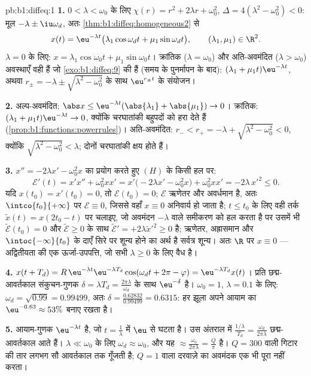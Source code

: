 \begin{solution}{pb:b1:diffeq:1}
\textbf{1.} $0 < \lambda < \omega_0$ के लिए $\chi(r) = r^2 + 2\lambda r +
\omega_0^2$, $\Delta = 4(\lambda^2 - \omega_0^2) < 0$: मूल $-\lambda \pm
\iu\omega_d$, अतः \cref{thm:b1:diffeq:homogeneous2} से
\[
x(t) = \eu^{-\lambda t}\bigl(\lambda_1\cos\omega_d t +
\mu_1\sin\omega_d t\bigr), \qquad (\lambda_1, \mu_1) \in \R^2 .
\]
$\lambda = 0$ के लिए: $x = \lambda_1\cos\omega_0 t + \mu_1\sin\omega_0 t$।
क्रांतिक ($\lambda = \omega_0$) और अति-अवमंदित ($\lambda > \omega_0$)
अवस्थाएँ वही हैं जो \cref{exo:b1:diffeq:9} की हैं (समय के पुनर्मापन के बाद):
$(\lambda_1 + \mu_1 t)\eu^{-\lambda t}$, अथवा $r_\pm = -\lambda \pm
\sqrt{\lambda^2 - \omega_0^2}$ के साथ $\eu^{r_\pm t}$ के संयोजन।

\textbf{2.} अल्प-अवमंदित: $\abs x \leq \eu^{-\lambda t}(\abs{\lambda_1} +
\abs{\mu_1}) \to 0$। क्रांतिक: $(\lambda_1 + \mu_1 t)\eu^{-\lambda t} \to
0$, क्योंकि चरघातांकी बहुपदों को हरा देते हैं
(\cref{prop:b1:functions:powerrules})। अति-अवमंदित: $r_- < r_+ = -\lambda +
\sqrt{\lambda^2 - \omega_0^2} < 0$, क्योंकि $\sqrt{\lambda^2 - \omega_0^2} <
\lambda$; दोनों चरघातांकी क्षय होते हैं।

\textbf{3.} $x'' = -2\lambda x' - \omega_0^2 x$ का प्रयोग करते हुए $(H)$ के
किसी हल पर:
\[
\mathcal E'(t) = x'x'' + \omega_0^2 x x'
= x'\bigl(-2\lambda x' - \omega_0^2 x\bigr) + \omega_0^2 xx'
= -2\lambda\,x'^2 \leq 0 .
\]
यदि $x(t_0) = x'(t_0) = 0$, तो $\mathcal E(t_0) = 0$; $\mathcal E$ ऋणेतर और
अवर्धमान है, अतः $\intco{t_0}{+\infty}$ पर $\mathcal E \equiv 0$, जिससे वहाँ
$x \equiv 0$ अनिवार्य हो जाता है; $t \leq t_0$ के लिए वही तर्क $\tilde x(t)
= x(2t_0 - t)$ पर चलाइए, जो अवमंदन $-\lambda$ वाले समीकरण को हल करता है पर
उसमें भी $\tilde{\mathcal E}(t_0) = 0$ और $\tilde{\mathcal E} \geq 0$ के साथ
$\tilde{\mathcal E}' = +2\lambda\tilde x'^2 \geq 0$ है; ऋणेतर, अह्रासमान और
$\intoc{-\infty}{t_0}$ के दाएँ सिरे पर शून्य होने का अर्थ है सर्वत्र शून्य।
अतः $\R$ पर $x \equiv 0$ --- अद्वितीयता की एक ऊर्जा-उपपत्ति, जो सभी $\lambda
\geq 0$ के लिए वैध है।

\textbf{4.} $x(t + T_d) = R\,\eu^{-\lambda t}\eu^{-\lambda T_d}\cos(\omega_d
t + 2\pi - \varphi) = \eu^{-\lambda T_d}x(t)$। प्रति छद्म-आवर्तकाल
संकुचन-गुणक $\delta = \lambda T_d = \frac{2\pi\lambda}{\omega_d}$ के साथ
$\eu^{-\delta}$ है। $\omega_0 = 1$, $\lambda = 0.1$ के लिए: $\omega_d =
\sqrt{0.99} = 0.99499$, अतः $\delta = \frac{0.62832}{0.99499} = 0.6315$: हर
झूला अपने आयाम का $\eu^{-0.63} \approx 53\%$ बनाए रखता है।

\textbf{5.} आयाम-गुणक $\eu^{-\lambda t}$ है, जो $t = \frac1\lambda$ में
$\eu$ से घटता है। उस अंतराल में $\frac{1/\lambda}{T_d} =
\frac{\omega_d}{2\pi\lambda}$ छद्म-आवर्तकाल आते हैं। $\lambda \ll \omega_0$
के लिए $\omega_d \approx \omega_0$, और यह $\approx
\frac{\omega_0}{2\pi\lambda} = \frac Q\pi$ है। $Q = 300$ वाली गिटार की तार
लगभग सौ आवर्तकाल तक गूँजती है; $Q = 1$ वाला दरवाज़े का अवमंदक एक भी पूरा
नहीं करता।


\end{solution}

